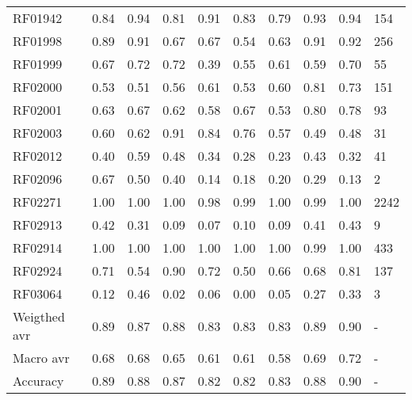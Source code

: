 \begin{tabular}{lrrrrrrrrl}
RF01942      &  0.84 &  0.94 &  0.81 &   0.91 &    0.83 &     0.79 &  0.93 & 0.94 &        154 \\
RF01998      &  0.89 &  0.91 &  0.67 &   0.67 &    0.54 &     0.63 &  0.91 & 0.92 &        256 \\
RF01999      &  0.67 &  0.72 &  0.72 &   0.39 &    0.55 &     0.61 &  0.59 & 0.70 &         55 \\
RF02000      &  0.53 &  0.51 &  0.56 &   0.61 &    0.53 &     0.60 &  0.81 & 0.73 &        151 \\
RF02001      &  0.63 &  0.67 &  0.62 &   0.58 &    0.67 &     0.53 &  0.80 & 0.78 &         93 \\
RF02003      &  0.60 &  0.62 &  0.91 &   0.84 &    0.76 &     0.57 &  0.49 & 0.48 &         31 \\
RF02012      &  0.40 &  0.59 &  0.48 &   0.34 &    0.28 &     0.23 &  0.43 & 0.32 &         41 \\
RF02096      &  0.67 &  0.50 &  0.40 &   0.14 &    0.18 &     0.20 &  0.29 & 0.13 &          2 \\
RF02271      &  1.00 &  1.00 &  1.00 &   0.98 &    0.99 &     1.00 &  0.99 & 1.00 &       2242 \\
RF02913      &  0.42 &  0.31 &  0.09 &   0.07 &    0.10 &     0.09 &  0.41 & 0.43 &          9 \\
RF02914      &  1.00 &  1.00 &  1.00 &   1.00 &    1.00 &     1.00 &  0.99 & 1.00 &        433 \\
RF02924      &  0.71 &  0.54 &  0.90 &   0.72 &    0.50 &     0.66 &  0.68 & 0.81 &        137 \\
RF03064      &  0.12 &  0.46 &  0.02 &   0.06 &    0.00 &     0.05 &  0.27 & 0.33 &          3 \\
Weigthed avr &  0.89 &  0.87 &  0.88 &   0.83 &    0.83 &     0.83 &  0.89 & 0.90 &          - \\
Macro avr    &  0.68 &  0.68 &  0.65 &   0.61 &    0.61 &     0.58 &  0.69 & 0.72 &          - \\
Accuracy     &  0.89 &  0.88 &  0.87 &   0.82 &    0.82 &     0.83 &  0.88 & 0.90 &          - \\
\bottomrule
\end{tabular}
